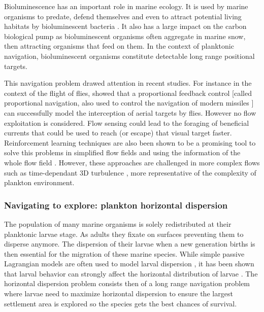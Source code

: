 Bioluminescence has an important role in marine ecology. 
It is used by marine organisms to predate, defend themselves and even to attract potential living habitats by bioluminescent bacteria  \citep{haddock2010bioluminescence}.
It also has a large impact on the carbon biological pump as bioluminescent organisms often aggregate in marine snow, then attracting organisms that feed on them.
In the context of planktonic navigation, bioluminescent organisms constitute detectable long range positional targets.

This navigation problem drawed attention in recent studies. For instance in the context of the flight of flies, \citet{fabian2018interception} showed that a proportional feedback control [called proportional navigation, also used to control the navigation of modern missiles \citep{shneydor1998missile}] can successfully model the interception of aerial targets by flies.
However no flow exploitation is considered.
Flow sensing could lead to the foraging of beneficial currents that could be used to reach (or escape) that visual target faster.
Reinforcement learning techniques are also been shown to be a promising tool to solve this problems in simplified flow fields \citep{gunnarson2021learning} and using the information of the whole flow field \citep{biferale2019zermelo}.
However, these approaches are challenged in more complex flows such as time-dependant 3D turbulence \citep{alageshan2020machine}, more representative of the complexity of plankton environment.

\subsubsection{Navigating to explore: plankton horizontal dispersion}

The population of many marine organisms is solely redistributed at their planktonic larvae stage.
As adults they fixate on surfaces preventing them to disperse anymore.
The dispersion of their larvae when a new generation births is then essential for the migration of these marine species.
While simple passive Lagrangian models are often used to model larval dispersion \citep{siegel2003lagrangian}, it has been shown that larval behavior can strongly affect the horizontal distribution of larvae \citep{naylor2006orientation, vikebo2007drift, morgan2021robotic}.
The horizontal dispersion problem consists then of a long range navigation problem where larvae need to maximize horizontal dispersion to ensure the largest settlement area is explored so the species gets the best chances of survival.

